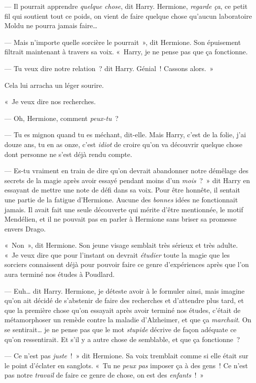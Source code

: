 --- Il pourrait apprendre \emph{quelque chose}, dit Harry. Hermione, \emph{regarde ça}, ce petit fil qui soutient tout ce poids, on vient de faire quelque chose qu'aucun laboratoire Moldu ne pourra jamais faire…

--- Mais n'importe quelle sorcière le pourrait~», dit Hermione. Son épuisement filtrait maintenant à travers sa voix. «~Harry, je ne pense pas que ça fonctionne.

--- Tu veux dire notre relation~? dit Harry. Génial~! Cassons alors.~»

Cela lui arracha un léger sourire.

«~Je veux dire nos recherches.

--- Oh, Hermione, comment \emph{peux-tu}~?

--- Tu es mignon quand tu es méchant, dit-elle. Mais Harry, c'est de la folie, j'ai douze ans, tu en as onze, c'est \emph{idiot} de croire qu'on va découvrir quelque chose dont personne ne s'est déjà rendu compte.

--- Es-tu vraiment en train de dire qu'on devrait abandonner notre démêlage des secrets de la magie après avoir essayé pendant moins d'un \emph{mois}~?~» dit Harry en essayant de mettre une note de défi dans sa voix. Pour être honnête, il sentait une partie de la fatigue d'Hermione. Aucune des \emph{bonnes} idées ne fonctionnait jamais. Il avait fait une seule découverte qui mérite d'être mentionnée, le motif Mendélien, et il ne pouvait pas en parler à Hermione sans briser sa promesse envers Drago.

«~Non~», dit Hermione. Son jeune visage semblait très sérieux et très adulte. «~Je veux dire que pour l'instant on devrait \emph{étudier} toute la magie que les sorciers connaissent déjà pour pouvoir faire ce genre d'expériences après que l'on aura terminé nos études à Poudlard.

--- Euh… dit Harry. Hermione, je déteste avoir à le formuler ainsi, mais imagine qu'on ait décidé de s'abstenir de faire des recherches et d'attendre plus tard, et que la première chose qu'on essayait après avoir terminé nos études, c'était de métamorphoser un remède contre la maladie d'Alzheimer, et que ça \emph{marchait}. On se sentirait… je ne pense pas que le mot \emph{stupide} décrive de façon adéquate ce qu'on ressentirait. Et s'il y a autre chose de semblable, et que ça fonctionne~?

--- Ce n'est pas \emph{juste}~!~» dit Hermione. Sa voix tremblait comme si elle était sur le point d'éclater en sanglots. «~Tu ne \emph{peux pas} imposer ça à des gens~! Ce n'est pas notre \emph{travail} de faire ce genre de chose, on est des \emph{enfants}~!~»

